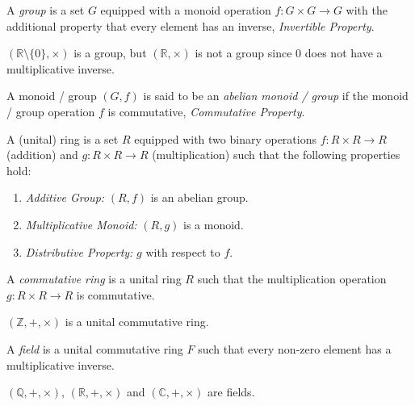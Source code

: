 \documentclass[11pt,fleqn]{book} %
\begin{document}
\begin{definition}[Group]
    A \emph{group} is a set $G$ equipped with a monoid operation $f: G \times G \to G$ with the additional property that every element has an inverse, \emph{Invertible Property}.
\end{definition}

\begin{example}
    $(\mathbb{R}\setminus\{0\}, \times)$ is a group, but $(\mathbb{R}, \times)$ is not a group since $0$ does not have a multiplicative inverse.
\end{example}

\begin{definition}
    A monoid / group $(G, f)$ is said to be an \emph{abelian monoid / group} if the monoid / group operation $f$ is commutative, \emph{Commutative Property}.
\end{definition}

\begin{definition}
    A (unital) ring is a set $R$ equipped with two binary operations $f: R \times R \to R$ (addition) and $g: R \times R \to R$ (multiplication) such that the following properties hold:
    \begin{enumerate}
        \item \emph{Additive Group:} $(R, f)$ is an abelian group.
        \item \emph{Multiplicative Monoid:} $(R, g)$ is a monoid.
        \item \emph{Distributive Property:} $g$ with respect to $f$.
    \end{enumerate}
\end{definition}

\begin{definition}
    A \emph{commutative ring} is a unital ring $R$ such that the multiplication operation $g: R \times R \to R$ is commutative.
\end{definition}

\begin{example}
    $(\mathbb{Z}, +, \times)$ is a unital commutative ring.
\end{example}

\begin{definition}[Field]
    A \emph{field} is a unital commutative ring $F$ such that every non-zero element has a multiplicative inverse.
\end{definition}

\begin{example}
    $(\mathbb{Q}, +, \times)$, $(\mathbb{R}, +, \times)$ and $(\mathbb{C}, +, \times)$ are fields.
\end{example}
\end{document}

